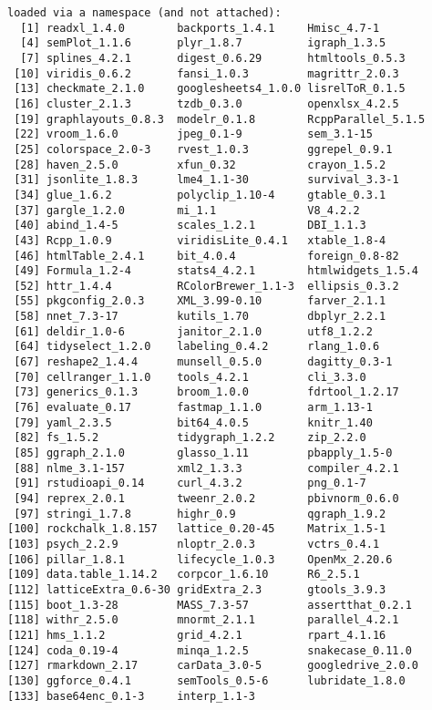 \documentclass[
  letterpaper,
  DIV=11,
  numbers=noendperiod]{scrreprt}
\begin{document}
\begin{verbatim}
loaded via a namespace (and not attached):
  [1] readxl_1.4.0        backports_1.4.1     Hmisc_4.7-1        
  [4] semPlot_1.1.6       plyr_1.8.7          igraph_1.3.5       
  [7] splines_4.2.1       digest_0.6.29       htmltools_0.5.3    
 [10] viridis_0.6.2       fansi_1.0.3         magrittr_2.0.3     
 [13] checkmate_2.1.0     googlesheets4_1.0.0 lisrelToR_0.1.5    
 [16] cluster_2.1.3       tzdb_0.3.0          openxlsx_4.2.5     
 [19] graphlayouts_0.8.3  modelr_0.1.8        RcppParallel_5.1.5 
 [22] vroom_1.6.0         jpeg_0.1-9          sem_3.1-15         
 [25] colorspace_2.0-3    rvest_1.0.3         ggrepel_0.9.1      
 [28] haven_2.5.0         xfun_0.32           crayon_1.5.2       
 [31] jsonlite_1.8.3      lme4_1.1-30         survival_3.3-1     
 [34] glue_1.6.2          polyclip_1.10-4     gtable_0.3.1       
 [37] gargle_1.2.0        mi_1.1              V8_4.2.2           
 [40] abind_1.4-5         scales_1.2.1        DBI_1.1.3          
 [43] Rcpp_1.0.9          viridisLite_0.4.1   xtable_1.8-4       
 [46] htmlTable_2.4.1     bit_4.0.4           foreign_0.8-82     
 [49] Formula_1.2-4       stats4_4.2.1        htmlwidgets_1.5.4  
 [52] httr_1.4.4          RColorBrewer_1.1-3  ellipsis_0.3.2     
 [55] pkgconfig_2.0.3     XML_3.99-0.10       farver_2.1.1       
 [58] nnet_7.3-17         kutils_1.70         dbplyr_2.2.1       
 [61] deldir_1.0-6        janitor_2.1.0       utf8_1.2.2         
 [64] tidyselect_1.2.0    labeling_0.4.2      rlang_1.0.6        
 [67] reshape2_1.4.4      munsell_0.5.0       dagitty_0.3-1      
 [70] cellranger_1.1.0    tools_4.2.1         cli_3.3.0          
 [73] generics_0.1.3      broom_1.0.0         fdrtool_1.2.17     
 [76] evaluate_0.17       fastmap_1.1.0       arm_1.13-1         
 [79] yaml_2.3.5          bit64_4.0.5         knitr_1.40         
 [82] fs_1.5.2            tidygraph_1.2.2     zip_2.2.0          
 [85] ggraph_2.1.0        glasso_1.11         pbapply_1.5-0      
 [88] nlme_3.1-157        xml2_1.3.3          compiler_4.2.1     
 [91] rstudioapi_0.14     curl_4.3.2          png_0.1-7          
 [94] reprex_2.0.1        tweenr_2.0.2        pbivnorm_0.6.0     
 [97] stringi_1.7.8       highr_0.9           qgraph_1.9.2       
[100] rockchalk_1.8.157   lattice_0.20-45     Matrix_1.5-1       
[103] psych_2.2.9         nloptr_2.0.3        vctrs_0.4.1        
[106] pillar_1.8.1        lifecycle_1.0.3     OpenMx_2.20.6      
[109] data.table_1.14.2   corpcor_1.6.10      R6_2.5.1           
[112] latticeExtra_0.6-30 gridExtra_2.3       gtools_3.9.3       
[115] boot_1.3-28         MASS_7.3-57         assertthat_0.2.1   
[118] withr_2.5.0         mnormt_2.1.1        parallel_4.2.1     
[121] hms_1.1.2           grid_4.2.1          rpart_4.1.16       
[124] coda_0.19-4         minqa_1.2.5         snakecase_0.11.0   
[127] rmarkdown_2.17      carData_3.0-5       googledrive_2.0.0  
[130] ggforce_0.4.1       semTools_0.5-6      lubridate_1.8.0    
[133] base64enc_0.1-3     interp_1.1-3       
\end{verbatim}
\end{document}
